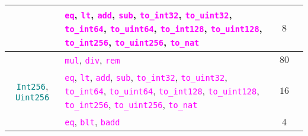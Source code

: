 \documentclass[9pt]{article}
\begin{document}
\begin{table}[!hbt]
\begin{tabular}{|c|p{4.1cm}|c|p{5cm}|}
		 & \texttt{\textcolor{magenta}{eq}}, \texttt{\textcolor{magenta}{lt}},
		 \texttt{\textcolor{magenta}{add}}, \texttt{\textcolor{magenta}{sub}},
		 \texttt{\textcolor{magenta}{to\_int32}},
		 \texttt{\textcolor{magenta}{to\_uint32}},
		 \texttt{\textcolor{magenta}{to\_int64}},
		 \texttt{\textcolor{magenta}{to\_uint64}},
		 \texttt{\textcolor{magenta}{to\_int128}},
		 \texttt{\textcolor{magenta}{to\_uint128}},
		 \texttt{\textcolor{magenta}{to\_int256}},
		 \texttt{\textcolor{magenta}{to\_uint256}},
		 \texttt{\textcolor{magenta}{to\_nat}}
		 & $8$  & \\ \hline \hline
		\multirow{4}{*}{\texttt{\textcolor{teal}{Int256}},
		\texttt{\textcolor{teal}{Uint256}}} &
		\texttt{\textcolor{magenta}{mul}},
		 \texttt{\textcolor{magenta}{div}}, \texttt{\textcolor{magenta}{rem}} &
		 $ 80 $  & \\ \cline{2-4}
		 & \texttt{\textcolor{magenta}{eq}}, \texttt{\textcolor{magenta}{lt}},
		 \texttt{\textcolor{magenta}{add}}, \texttt{\textcolor{magenta}{sub}},
		 \texttt{\textcolor{magenta}{to\_int32}},
		 \texttt{\textcolor{magenta}{to\_uint32}},
		 \texttt{\textcolor{magenta}{to\_int64}},
		 \texttt{\textcolor{magenta}{to\_uint64}},
		 \texttt{\textcolor{magenta}{to\_int128}},
		 \texttt{\textcolor{magenta}{to\_uint128}},
		 \texttt{\textcolor{magenta}{to\_int256}},
		 \texttt{\textcolor{magenta}{to\_uint256}},
		 \texttt{\textcolor{magenta}{to\_nat}}
		 & $ 16 $  & \\ \hline \hline
		\texttt{\textcolor{teal}{BNum}} &
		\texttt{\textcolor{magenta}{eq}}, \texttt{\textcolor{magenta}{blt}},
		\texttt{\textcolor{magenta}{badd}} & 4  & \\ \hline 
	\end{tabular}
\end{table}




\end{document}
